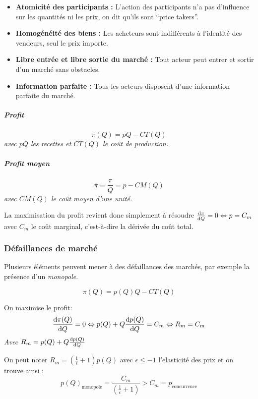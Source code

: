\begin{itemize}[label =]
	\item \textbf{Atomicité des participants :} L'action des participants n'a pas d'influence sur les quantités ni les prix, on dit qu'ils sont ``price takers''.
	\item \textbf{Homogénéité des biens :} Les acheteurs sont indifférents à l'identité des vendeurs, seul le prix importe.
	\item \textbf{Libre entrée et libre sortie du marché :} Tout acteur peut entrer et sortir d'un marché sans obstacles.
	\item \textbf{Information parfaite :} Tous les acteurs disposent d'une information parfaite du marché.
\end{itemize}
\begin{tcolorbox}[title=Concurrence pure et parfaite]

\subparagraph{Profit} %
\label{subp:profit}

\[
	\pi(Q)= pQ-CT(Q)
\]
\emph{avec $pQ$ les recettes et $CT(Q)$ le coût de production.}

\subparagraph{Profit moyen} %
\label{subp:profit_moyen}
\[
	\bar{\pi}= \frac{\pi}{Q}= p - CM(Q)
\]
\emph{avec $CM(Q)$ le coût moyen d'une unité.}



La maximisation du profit revient donc simplement à résoudre $\frac{\operatorname{d}\! \pi}{\operatorname{d}\! Q}=0 \Leftrightarrow p=C_m$ avec $C_m$ le coût marginal, c'est-à-dire la dérivée du coût total.
\end{tcolorbox}


\subsubsection{Défaillances de marché} %
\label{sub:defaillances_de_marche}
Plusieurs éléments peuvent mener à des défaillances des marchés, 
par exemple la présence d'un \emph{monopole}.
\begin{tcolorbox}[title=Monopole]


\[
	\pi(Q)= p(Q)Q- CT(Q)
\]

On maximise le profit: 
\[
	\frac{\operatorname{d}\! \pi(Q)}{\operatorname{d}\! Q}=0 \Leftrightarrow p(Q)+ Q\frac{\operatorname{d}\! p(Q)}{\operatorname{d}\! Q}
  = C_m \Leftrightarrow R_m= C_m
\]
\emph{Avec $R_m=p(Q)+ Q\frac{\operatorname{d}\! p(Q)}{\operatorname{d}\! Q}$}

On peut noter $R_m= \left(\frac{1}{\epsilon}+1 \right)p(Q)$ avec $\epsilon \leq -1$ 
l'elasticité des prix et on trouve ainsi : 
\[
	p(Q)_{\text{monopole}}=\frac{C_m}{\left(\frac{1}{\epsilon}+1 \right)} > C_m=p_{\text{concurrence}}
\]
\end{tcolorbox}


